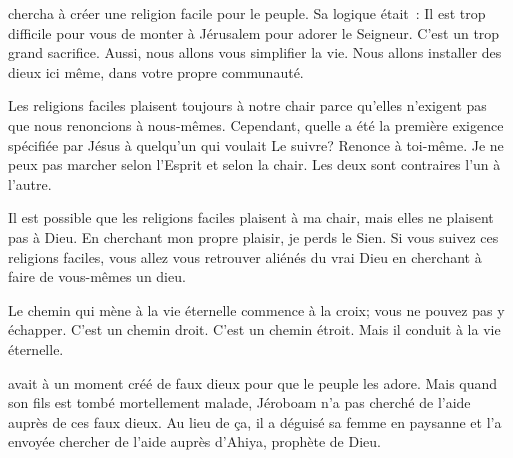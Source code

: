  chercha à créer une religion facile
 pour le peuple. Sa logique était~:
 \og Il est trop difficile pour vous de monter à Jérusalem
 pour adorer le Seigneur. C'est un trop grand sacrifice.
 Aussi, nous allons vous simplifier la vie.
 Nous allons installer des dieux ici même,
 dans votre propre communauté. \fg{}

Les religions faciles plaisent toujours à notre chair
 parce qu'elles n'exigent pas que nous renoncions à nous-mêmes.
 Cependant, quelle a été la première exigence spécifiée par Jésus
 à quelqu'un qui voulait Le suivre?
 \og Renonce à toi-même. \fg{}
 Je ne peux pas marcher selon l'Esprit et selon la chair.
 Les deux sont contraires l'un à l'autre. 


Il est possible que les religions faciles plaisent à ma chair,
 mais elles ne plaisent pas à Dieu.
 En cherchant mon propre plaisir, je perds le Sien.
 Si vous suivez ces religions faciles, vous allez vous retrouver aliénés
 du vrai Dieu en cherchant à faire de vous-mêmes un dieu. 

Le chemin qui mène à la vie éternelle commence à la croix;
 vous ne pouvez pas y échapper.
 C'est un chemin droit. C'est un chemin étroit.
 Mais il conduit à la vie éternelle. 

\dvrule






 avait à un moment créé de faux dieux
 pour que le peuple les adore.
 Mais quand son fils est tombé mortellement malade,
 Jéroboam n'a pas cherché de l'aide auprès de ces faux dieux.
 Au lieu de ça, il a déguisé sa femme en paysanne
 et l'a envoyée chercher de l'aide auprès d'Ahiya, prophète de Dieu.


